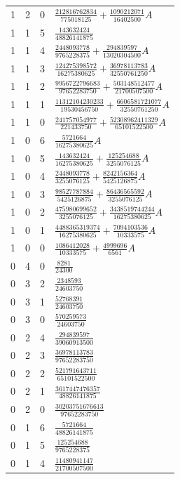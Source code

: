 \begin{longtable}{rrrl}
1 & 2 & 0 & $\frac{212816762834}{775018125}+\frac{1090212071}{16402500}A$\\
1 & 1 & 5 & $\frac{143632424}{48826141875}$\\
1 & 1 & 4 & $\frac{2448093778}{9765228375}+\frac{294839597}{13020304500}A$\\
1 & 1 & 3 & $\frac{124275398572}{16275380625}+\frac{36978113783}{32550761250}A$\\
1 & 1 & 2 & $\frac{9956722796683}{97652283750}+\frac{503148512477}{21700507500}A$\\
1 & 1 & 1 & $\frac{11312104230233}{19530456750}+\frac{6606581721077}{32550761250}A$\\
1 & 1 & 0 & $\frac{241757054977}{221433750}+\frac{52308962411329}{65101522500}A$\\
1 & 0 & 6 & $\frac{5721664}{16275380625}A$\\
1 & 0 & 5 & $\frac{143632424}{16275380625}+\frac{125254688}{3255076125}A$\\
1 & 0 & 4 & $\frac{2448093778}{3255076125}+\frac{8242156364}{5425126875}A$\\
1 & 0 & 3 & $\frac{98527787884}{5425126875}+\frac{86436565592}{3255076125}A$\\
1 & 0 & 2 & $\frac{475980699652}{3255076125}+\frac{3438519744244}{16275380625}A$\\
1 & 0 & 1 & $\frac{4488365319374}{16275380625}+\frac{7094103536}{10333575}A$\\
1 & 0 & 0 & $\frac{1086412028}{10333575}+\frac{4999696}{6561}A$\\
0 & 4 & 0 & $\frac{8281}{24300}$\\
0 & 3 & 2 & $\frac{2348593}{24603750}$\\
0 & 3 & 1 & $\frac{52768391}{24603750}$\\
0 & 3 & 0 & $\frac{570259573}{24603750}$\\
0 & 2 & 4 & $\frac{294839597}{39060913500}$\\
0 & 2 & 3 & $\frac{36978113783}{97652283750}$\\
0 & 2 & 2 & $\frac{521791643711}{65101522500}$\\
0 & 2 & 1 & $\frac{3617447476357}{48826141875}$\\
0 & 2 & 0 & $\frac{30203751676613}{97652283750}$\\
0 & 1 & 6 & $\frac{5721664}{48826141875}$\\
0 & 1 & 5 & $\frac{125254688}{9765228375}$\\
0 & 1 & 4 & $\frac{11480941147}{21700507500}$\\

\end{longtable}
